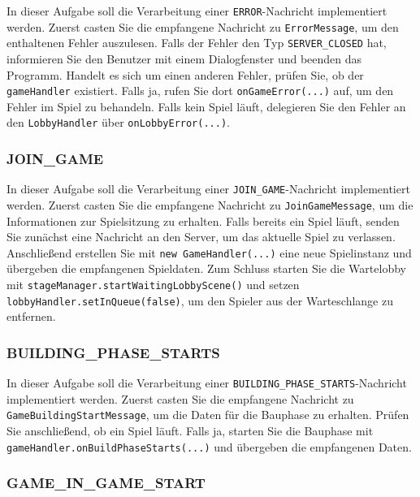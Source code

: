 \documentclass[12pt]{article}
\begin{document}
In dieser Aufgabe soll die Verarbeitung einer \texttt{ERROR}-Nachricht implementiert werden. 
Zuerst casten Sie die empfangene Nachricht zu \texttt{ErrorMessage}, 
um den enthaltenen Fehler auszulesen. 
Falls der Fehler den Typ \texttt{SERVER\_CLOSED} hat, 
informieren Sie den Benutzer mit einem Dialogfenster und beenden das Programm. 
Handelt es sich um einen anderen Fehler, prüfen Sie, ob der \texttt{gameHandler} existiert. 
Falls ja, rufen Sie dort \texttt{onGameError(...)} auf, 
um den Fehler im Spiel zu behandeln. 
Falls kein Spiel läuft, delegieren Sie den Fehler an den \texttt{LobbyHandler} über \texttt{onLobbyError(...)}.

\subsubsection*{JOIN\_GAME}

In dieser Aufgabe soll die Verarbeitung einer \texttt{JOIN\_GAME}-Nachricht implementiert werden. 
Zuerst casten Sie die empfangene Nachricht zu \texttt{JoinGameMessage}, 
um die Informationen zur Spielsitzung zu erhalten. 
Falls bereits ein Spiel läuft, senden Sie zunächst eine Nachricht an den Server, 
um das aktuelle Spiel zu verlassen. 
Anschließend erstellen Sie mit \texttt{new GameHandler(...)} eine neue Spielinstanz 
und übergeben die empfangenen Spieldaten. 
Zum Schluss starten Sie die Wartelobby mit \texttt{stageManager.\hspace{0pt}startWaitingLobbyScene()} 
und setzen \texttt{lobbyHandler.setInQueue(false)}, um den Spieler aus der Warteschlange zu entfernen.

\subsubsection*{BUILDING\_PHASE\_STARTS}

In dieser Aufgabe soll die Verarbeitung einer \texttt{BUILDING\_PHASE\_STARTS}-Nachricht implementiert werden. 
Zuerst casten Sie die empfangene Nachricht zu \texttt{GameBuilding\hspace{0pt}StartMessage}, 
um die Daten für die Bauphase zu erhalten. 
Prüfen Sie anschließend, ob ein Spiel läuft. 
Falls ja, starten Sie die Bauphase mit \texttt{gameHandler.onBuildPhaseStarts(...)} 
und übergeben die empfangenen Daten.

\subsubsection*{GAME\_IN\_GAME\_START}
\end{document}
